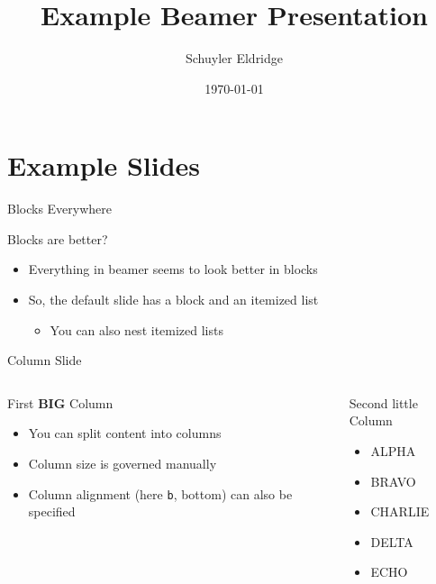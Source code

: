 \documentclass[handout]{beamer}
\title[Example Presentation]{Example Beamer Presentation}
\author[schuyler.eldridge@gmail.com]{Schuyler Eldridge}
\date[\today]{\today}
\begin{document}
\maketitle

\section*{Example Slides}

\begin{frame}{Blocks Everywhere}
  \begin{block}{Blocks are better?}
    \begin{itemize}
    \item<1-> Everything in beamer seems to look better in blocks
    \item<2-> So, the default slide has a block and an itemized list
      \begin{itemize}
      \item<3-> You can also nest itemized lists
      \end{itemize}
    \end{itemize}
  \end{block}
\end{frame}

\begin{frame}{Column Slide}
  \begin{columns}[b]
    \begin{block}{First \textbf{BIG} Column}
      \begin{itemize}
      \item You can split content into columns
      \item Column size is governed manually
      \item Column alignment (here \texttt{b}, bottom) can also be specified
      \end{itemize}
    \end{block}

    \begin{block}{Second {\tiny little} Column}
      \begin{itemize}
      \item ALPHA
      \item BRAVO
      \item CHARLIE
      \item DELTA
      \item ECHO
      \end{itemize}
    \end{block}
  \end{columns}
\end{frame}
\end{document}
